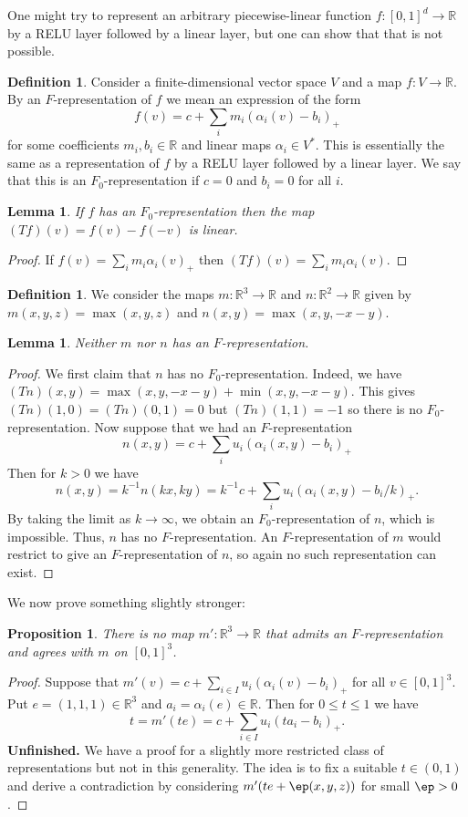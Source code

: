 \documentclass{amsart}
\newcommand{\R}         {{\mathbb{R}}}
\newcommand{\al}        {\alpha}
\renewcommand{\:}{\colon}
\newtheorem{lemma}[theorem]{Lemma}
\newtheorem{proposition}[theorem]{Proposition}
\theoremstyle{definition}
\newtheorem{definition}[theorem]{Definition}
\begin{document}
One might try to represent an arbitrary piecewise-linear function
$f\:[0,1]^d\to\R$ by a RELU layer followed by a linear layer, but one
can show that that is not possible.  

\begin{definition}
 Consider a finite-dimensional vector space $V$ and a map $f\:V\to\R$.
 By an $F$-representation of $f$ we mean an expression of the form 
 \[ f(v)=c+\sum_im_i(\al_i(v)-b_i)_+ \]
 for some coefficients $m_i,b_i\in\R$ and linear maps $\al_i\in V^*$.
 This is essentially the same as a representation of $f$ by a RELU
 layer followed by a linear layer.  We say that this is an
 $F_0$-representation if $c=0$ and $b_i=0$ for all $i$.
\end{definition}

\begin{lemma}
 If $f$ has an $F_0$-representation then the map $(Tf)(v)=f(v)-f(-v)$ is
 linear. 
\end{lemma}
\begin{proof}
 If $f(v)=\sum_im_i\al_i(v)_+$ then $(Tf)(v)=\sum_im_i\al_i(v)$.
\end{proof}

\begin{definition}
 We consider the maps $m\:\R^3\to\R$ and $n\:\R^2\to\R$ given by
 $m(x,y,z)=\max(x,y,z)$ and $n(x,y)=\max(x,y,-x-y)$.
\end{definition}

\begin{lemma}
 Neither $m$ nor $n$ has an $F$-representation.
\end{lemma}
\begin{proof}
 We first claim that $n$ has no $F_0$-representation.  Indeed, we have
 $(Tn)(x,y)=\max(x,y,-x-y)+\min(x,y,-x-y)$.  This gives
 $(Tn)(1,0)=(Tn)(0,1)=0$ but $(Tn)(1,1)=-1$ so there is no
 $F_0$-representation.  Now suppose that we had an $F$-representation 
 \[ n(x,y) = c+\sum_iu_i(\al_i(x,y)-b_i)_+ \] 
 Then for $k>0$ we have 
 \[ n(x,y) = k^{-1}n(kx,ky) = 
     k^{-1}c + \sum_iu_i(\al_i(x,y)-b_i/k)_+.
 \]
 By taking the limit as $k\to\infty$, we obtain an
 $F_0$-representation of $n$, which is impossible.  Thus, $n$ has no
 $F$-representation.  An $F$-representation of $m$ would restrict to
 give an $F$-representation of $n$, so again no such representation
 can exist.
\end{proof}

We now prove something slightly stronger:
\begin{proposition}
 There is no map $m'\:\R^3\to\R$ that admits an $F$-representation and
 agrees with $m$ on $[0,1]^3$.
\end{proposition}
\begin{proof}
 Suppose that $m'(v)=c+\sum_{i\in I}u_i(\al_i(v)-b_i)_+$ for all
 $v\in[0,1]^3$.  Put $e=(1,1,1)\in\R^3$ and $a_i=\al_i(e)\in\R$.  Then
 for $0\leq t\leq 1$ we have 
 \[ t = m'(te) = c + \sum_{i\in I}u_i(ta_i-b_i)_+. \]
 \textbf{Unfinished.}  We have a proof for a slightly more restricted
 class of representations but not in this generality.  The idea is to
 fix a suitable $t\in(0,1)$ and derive a contradiction by considering
 $m'(te+\ep(x,y,z))$ for small $\ep>0$.
\end{proof}
\end{document}
